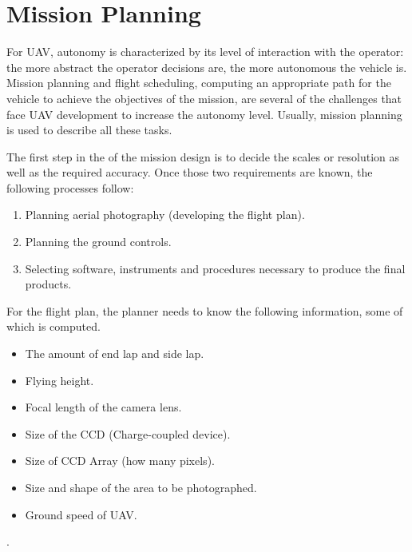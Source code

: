 \section{Mission Planning}
For UAV, autonomy is characterized by its level of interaction with the operator: the more abstract the operator decisions are, the more autonomous the vehicle is. Mission planning and flight scheduling, computing an appropriate path for the vehicle to achieve the objectives of the mission, are several of the challenges that face UAV development to increase the autonomy level. Usually, mission planning is used to describe all these tasks.\cite{4281723}

The first step in the of the mission design is to decide the scales or resolution as well as the required accuracy. Once those two requirements are known, the following processes follow:
\begin{enumerate}
\item Planning aerial photography (developing the flight plan).
\item Planning the ground controls.
\item Selecting software, instruments and procedures necessary to produce the final products.
\end{enumerate}
For the flight plan, the planner needs to know the following information, some of which is computed.\cite{Design_plann}
\begin{itemize}
\item The amount of end lap and side lap.
\item Flying height.
\item Focal length of the camera lens.
\item Size of the CCD (Charge-coupled device).
\item Size of CCD Array (how many pixels).
\item Size and shape of the area to be photographed.
\item Ground speed of UAV.
\end{itemize}.

